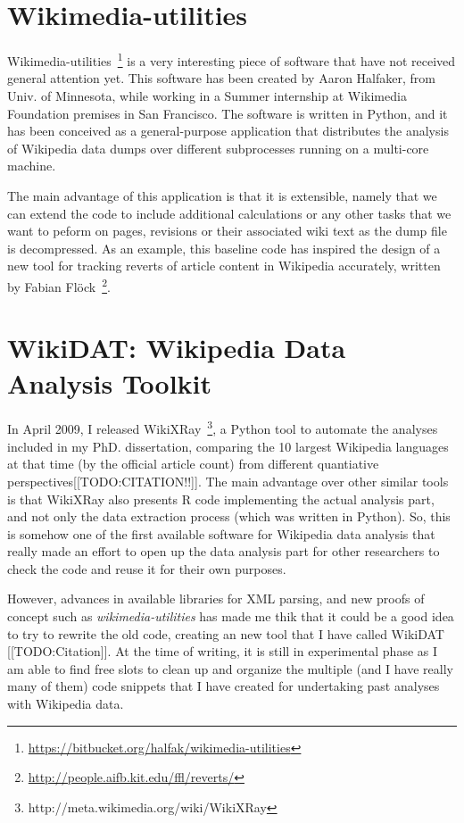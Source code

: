 \section{Wikimedia-utilities}
Wikimedia-utilities~\footnote{\url{https://bitbucket.org/halfak/wikimedia-utilities}} 
is a very interesting piece of software that have not received general attention yet.
This software has been created by Aaron Halfaker, from Univ. of Minnesota, while
working in a Summer internship at Wikimedia Foundation premises in San Francisco.
The software is written in Python, and it has been conceived as a general-purpose
application that distributes the analysis of Wikipedia data dumps over different
subprocesses running on a multi-core machine.

The main advantage of this application is that it is extensible, namely that we can
extend the code to include additional calculations or any other tasks that we want
to peform on pages, revisions or their associated wiki text as the dump file
is decompressed. As an example, this baseline code has inspired the design of a 
new tool for tracking reverts of article content in Wikipedia accurately, written
by Fabian Flöck~\footnote{\url{http://people.aifb.kit.edu/ffl/reverts/}}.

\section{WikiDAT: Wikipedia Data Analysis Toolkit}
\label{sec:WikiDAT}
In April 2009, I released WikiXRay~\footnote{http://meta.wikimedia.org/wiki/WikiXRay},
a Python tool to automate the analyses included in my PhD. dissertation, comparing
the 10 largest Wikipedia languages at that time (by the official article count) from
different quantiative perspectives[[TODO:CITATION!!]]. The main advantage over other
similar tools is that WikiXRay also presents R code implementing the actual analysis
part, and not only the data extraction process (which was written in Python). So, this
is somehow one of the first available software for Wikipedia data analysis that really
made an effort to open up the data analysis part for other researchers to check the
code and reuse it for their own purposes.

However, advances in available libraries for XML parsing, and new proofs of concept
such as \textit{wikimedia-utilities} has made me thik that it could be a good idea
to try to rewrite the old code, creating an new tool that I have called WikiDAT
[[TODO:Citation]]. At the
time of writing, it is still in experimental phase as I am able to find free slots to
clean up and organize the multiple (and I have really many of them) code snippets that
I have created for undertaking past analyses with Wikipedia data.

